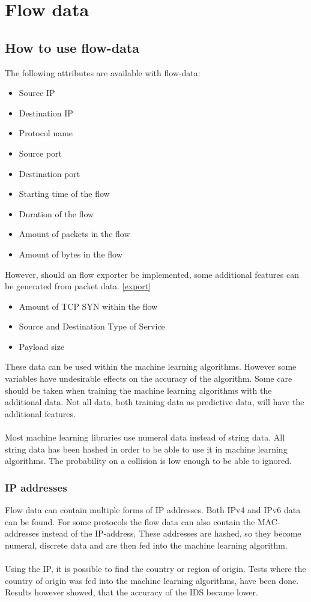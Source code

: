 
\chapter{Flow data} %

\label{flow} %

\section{How to use flow-data}
The following attributes are available with flow-data:
\begin{itemize}
\item Source IP
\item Destination IP
\item Protocol name
\item Source port
\item Destination port
\item Starting time of the flow
\item Duration of the flow
\item Amount of packets in the flow
\item Amount of bytes in the flow
\end{itemize}
However, should an flow exporter be implemented, some additional features can be generated from packet data. \ref{export}
\begin{itemize}
\item Amount of TCP SYN within the flow
\item Source and Destination Type of Service
\item Payload size
\end{itemize}
These data can be used within the machine learning algorithms. However some variables have undesirable effects on the accuracy of the algorithm. Some care should be taken when training the machine learning algorithms with the additional data. Not all data, both training data as predictive data, will have the additional features.\\
\\
Most machine learning libraries use numeral data instead of string data. All string data has been hashed in order to be able to use it in machine learning algorithms. The probability on a collision is low enough to be able to ignored.

\subsection{IP addresses}
Flow data can contain multiple forms of IP addresses. Both IPv4 and IPv6 data can be found. For some protocols the flow data can also contain the MAC-addresses instead of the IP-address. These addresses are hashed, so they become numeral, discrete data and are then fed into the machine learning algorithm.\\
\\
Using the IP, it is possible to find the country or region of origin. Tests where the country of origin was fed into the machine learning algorithms, have been done. Results however showed, that the accuracy of the IDS became lower.

